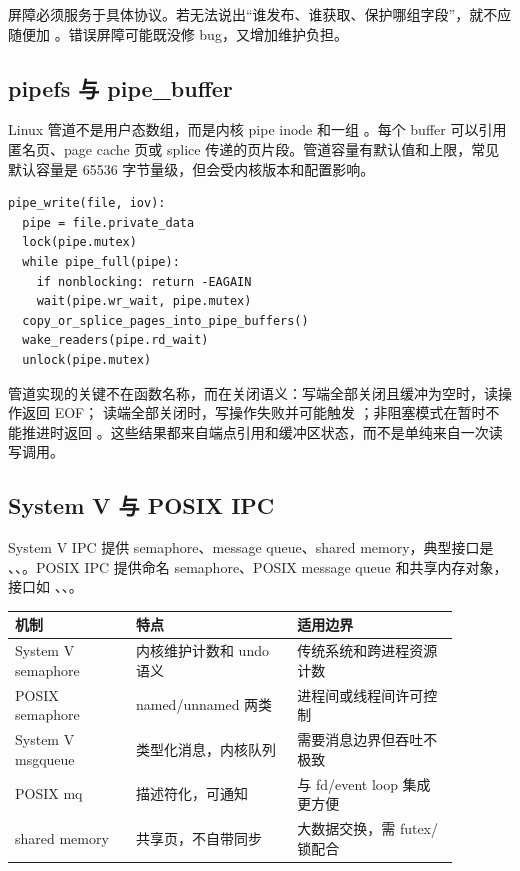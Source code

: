 屏障必须服务于具体协议。若无法说出“谁发布、谁获取、保护哪组字段”，就不应随便加 。错误屏障可能既没修 bug，又增加维护负担。

\subsection{pipefs 与 pipe\_buffer}

Linux 管道不是用户态数组，而是内核 pipe inode 和一组 。每个 buffer 可以引用匿名页、page cache 页或 splice 传递的页片段。管道容量有默认值和上限，常见默认容量是 65536 字节量级，但会受内核版本和配置影响。

\begin{lstlisting}
pipe_write(file, iov):
  pipe = file.private_data
  lock(pipe.mutex)
  while pipe_full(pipe):
    if nonblocking: return -EAGAIN
    wait(pipe.wr_wait, pipe.mutex)
  copy_or_splice_pages_into_pipe_buffers()
  wake_readers(pipe.rd_wait)
  unlock(pipe.mutex)
\end{lstlisting}

管道实现的关键不在函数名称，而在关闭语义：写端全部关闭且缓冲为空时，读操作返回 EOF；
读端全部关闭时，写操作失败并可能触发 ；非阻塞模式在暂时不能推进时返回
。这些结果都来自端点引用和缓冲区状态，而不是单纯来自一次读写调用。

\subsection{System V 与 POSIX IPC}

System V IPC 提供 semaphore、message queue、shared memory，典型接口是 、、。POSIX IPC 提供命名 semaphore、POSIX message queue 和共享内存对象，接口如 、、。

\begin{longtable}{p{0.24\linewidth}p{0.32\linewidth}p{0.32\linewidth}}
\toprule
机制 & 特点 & 适用边界 \\
\midrule
System V semaphore & 内核维护计数和 undo 语义 & 传统系统和跨进程资源计数 \\
POSIX semaphore & named/unnamed 两类 & 进程间或线程间许可控制 \\
System V msgqueue & 类型化消息，内核队列 & 需要消息边界但吞吐不极致 \\
POSIX mq & 描述符化，可通知 & 与 fd/event loop 集成更方便 \\
shared memory & 共享页，不自带同步 & 大数据交换，需 futex/锁配合 \\
\bottomrule
\end{longtable}


